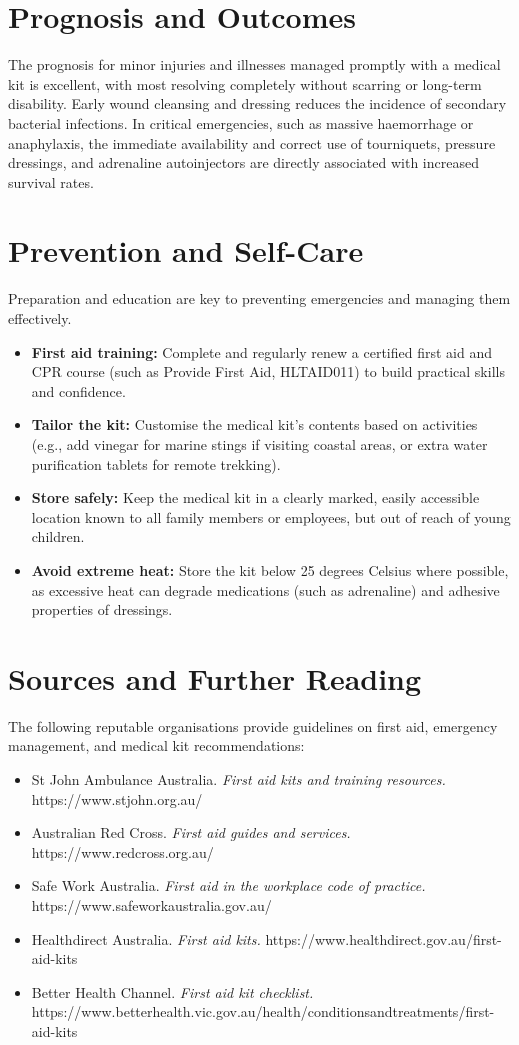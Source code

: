 \section*{Prognosis and Outcomes}
The prognosis for minor injuries and illnesses managed promptly with a medical kit is excellent, with most resolving completely without scarring or long-term disability. Early wound cleansing and dressing reduces the incidence of secondary bacterial infections. In critical emergencies, such as massive haemorrhage or anaphylaxis, the immediate availability and correct use of tourniquets, pressure dressings, and adrenaline autoinjectors are directly associated with increased survival rates.

\section*{Prevention and Self-Care}
Preparation and education are key to preventing emergencies and managing them effectively.
\begin{itemize}
    \item \textbf{First aid training:} Complete and regularly renew a certified first aid and CPR course (such as Provide First Aid, HLTAID011) to build practical skills and confidence.
    \item \textbf{Tailor the kit:} Customise the medical kit's contents based on activities (e.g., add vinegar for marine stings if visiting coastal areas, or extra water purification tablets for remote trekking).
    \item \textbf{Store safely:} Keep the medical kit in a clearly marked, easily accessible location known to all family members or employees, but out of reach of young children.
    \item \textbf{Avoid extreme heat:} Store the kit below 25 degrees Celsius where possible, as excessive heat can degrade medications (such as adrenaline) and adhesive properties of dressings.
\end{itemize}

\section*{Sources and Further Reading}
The following reputable organisations provide guidelines on first aid, emergency management, and medical kit recommendations:
\begin{itemize}
    \item St John Ambulance Australia. \textit{First aid kits and training resources.} https://www.stjohn.org.au/
    \item Australian Red Cross. \textit{First aid guides and services.} https://www.redcross.org.au/
    \item Safe Work Australia. \textit{First aid in the workplace code of practice.} https://www.safeworkaustralia.gov.au/
    \item Healthdirect Australia. \textit{First aid kits.} https://www.healthdirect.gov.au/first-aid-kits
    \item Better Health Channel. \textit{First aid kit checklist.} https://www.betterhealth.vic.gov.au/health/conditionsandtreatments/first-aid-kits
\end{itemize}
